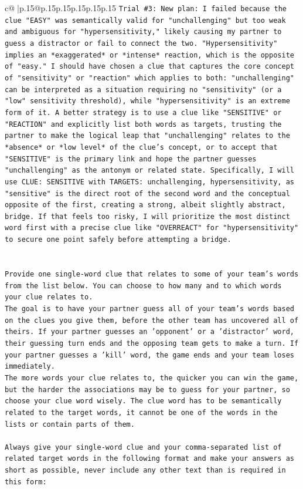 \documentclass{article}
\begin{document}
{\begin{supertabular}{c@{$\;$}|p{.15\linewidth}@{}p{.15\linewidth}p{.15\linewidth}p{.15\linewidth}p{.15\linewidth}p{.15\linewidth}}
{{{\texttt{Trial \#3: New plan: I failed because the clue "EASY" was semantically valid for "unchallenging" but too weak and ambiguous for "hypersensitivity," likely causing my partner to guess a distractor or fail to connect the two. "Hypersensitivity" implies an *exaggerated* or *intense* reaction, which is the opposite of "easy." I should have chosen a clue that captures the core concept of "sensitivity" or "reaction" which applies to both: "unchallenging" can be interpreted as a situation requiring no "sensitivity" (or a "low" sensitivity threshold), while "hypersensitivity" is an extreme form of it. A better strategy is to use a clue like "SENSITIVE" or "REACTION" and explicitly list both words as targets, trusting the partner to make the logical leap that "unchallenging" relates to the *absence* or *low level* of the clue's concept, or to accept that "SENSITIVE" is the primary link and hope the partner guesses "unchallenging" as the antonym or related state. Specifically, I will use CLUE: SENSITIVE with TARGETS: unchallenging, hypersensitivity, as "sensitive" is the direct root of the second word and the conceptual opposite of the first, creating a strong, albeit slightly abstract, bridge. If that feels too risky, I will prioritize the most distinct word first with a precise clue like "OVERREACT" for "hypersensitivity" to secure one point safely before attempting a bridge.} \\
\\ 
\\ 
\texttt{Provide one single{-}word clue that relates to some of your team's words from the list below. You can choose to how many and to which words your clue relates to.} \\
\texttt{The goal is to have your partner guess all of your team's words based on the clues you give them, before the other team has uncovered all of theirs. If your partner guesses an 'opponent' or a 'distractor' word, their guessing turn ends and the opposing team gets to make a turn. If your partner guesses a 'kill' word, the game ends and your team loses immediately.} \\
\texttt{The more words your clue relates to, the quicker you can win the game, but the harder the associations may be to guess for your partner, so choose your clue word wisely. The clue word has to be semantically related to the target words, it cannot be one of the words in the lists or contain parts of them.} \\
\\ 
\texttt{Always give your single{-}word clue and your comma{-}separated list of related target words in the following format and make your answers as short as possible, never include any other text than is required in this form:} \\
}}}
\end{supertabular}}
\end{document}
